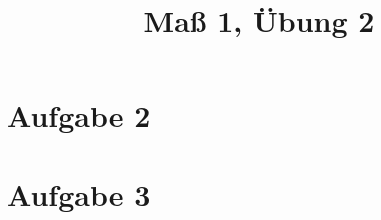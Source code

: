 \documentclass[]{article}
\author{}
\title{Maß 1, Übung 2}
\begin{document}
    \begin{titlepage}
        \maketitle
    \end{titlepage}
    
    \section{Aufgabe 2}
    
    \section{Aufgabe 3}
    

    
    
\end{document}
